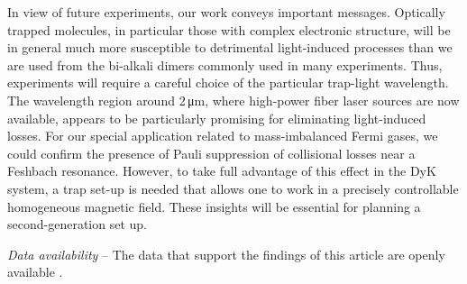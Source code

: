 In view of future experiments, our work conveys important messages. Optically trapped molecules, in particular those with complex electronic structure, will be in general much more susceptible to detrimental light-induced processes than we are used from the bi-alkali dimers commonly used in many experiments. Thus, experiments will require a careful choice of the particular trap-light wavelength. The wavelength region around 2\,\unit{\micro m}, where high-power fiber laser sources are now available, appears to be particularly promising for eliminating light-induced losses. For our special application related to mass-imbalanced Fermi gases, we could confirm the presence of Pauli suppression of collisional losses near a Feshbach resonance. However, to take full advantage of this effect in the DyK system, a trap set-up is needed that allows one to work in a precisely controllable homogeneous magnetic field. These insights will be essential for planning a second-generation set up.


\bigskip
{
	{\em Data availability} -- The data that support the findings of this article are openly available \cite{repository}.
}